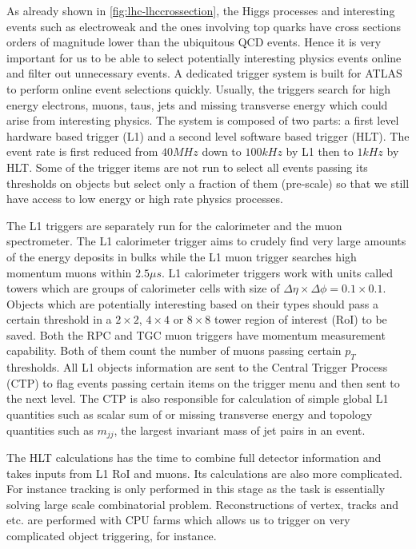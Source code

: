 \label{sec:detector-trigger}

As already shown in \ref{fig:lhc-lhccrossection}, the Higgs processes and interesting events such as electroweak and the ones involving top quarks have cross sections orders of magnitude lower than the ubiquitous QCD events. Hence it is very important for us to be able to select potentially interesting physics events online and filter out unnecessary events. A dedicated trigger system is built for ATLAS to perform online event selections quickly. Usually, the triggers search for high energy electrons, muons, taus, jets and missing transverse energy which could arise from interesting physics. The system is composed of two parts: a first level hardware based trigger (L1) and a second level software based trigger (HLT)\cite{ATL-DAQ-PROC-2016-039}. The event rate is first reduced from $40MHz$ down to $100kHz$ by L1 then to $1kHz$ by HLT. Some of the trigger items are not run to select all events passing its thresholds on objects but select only a fraction of them (pre-scale) so that we still have access to low energy or high rate physics processes. 

The L1 triggers are separately run for the calorimeter and the muon spectrometer\cite{ATL-DAQ-PROC-2016-039}. The L1 calorimeter trigger aims to crudely find very large amounts of the energy deposits in bulks while the L1 muon trigger searches high momentum muons within $2.5\mu s$. L1 calorimeter triggers work with units called towers which are groups of calorimeter cells with size of $\Delta \eta \times \Delta \phi = 0.1\times0.1$. Objects which are potentially interesting based on their types should pass a certain threshold in a $2\times2$, $4\times4$ or $8\times8$ tower region of interest (RoI) to be saved. Both the RPC and TGC muon triggers have momentum measurement capability. Both of them count the number of muons passing certain $p_T$ thresholds. All L1 objects information are sent to the Central Trigger Process (CTP) to flag events passing certain items on the trigger menu and then sent to the next level. The CTP is also responsible for calculation of simple global L1 quantities such as scalar sum of or missing transverse energy and topology quantities such as $m_{jj}$, the largest invariant mass of jet pairs in an event. 

The HLT calculations has the time to combine full detector information and takes inputs from L1 RoI and muons\cite{ATL-DAQ-PROC-2016-039}. Its calculations are also more complicated. For instance tracking is only performed in this stage as the task is essentially solving large scale combinatorial problem. Reconstructions of vertex, tracks and etc. are performed with CPU farms which allows us to trigger on very complicated object triggering, \bjets for instance. 
